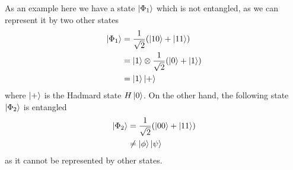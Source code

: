 As an example here we have a state $\ket{\Phi_1}$ which is not entangled, as we can represent it by two other states
\begin{equation}
\begin{split}
\ket{\Phi_1} &= \frac{1}{\sqrt{2}} ( \ket{10} + \ket{11}) \\ 
&= \ket{1}\otimes \frac{1}{\sqrt{2}} ( \ket{0} + \ket{1})\\ 
&= \ket{1} \ket{+}
\end{split}
\end{equation}
where $\ket +$ is the Hadmard  state $H \ket{0}$.
On the other hand, the following state $\ket{\Phi_2}$ is entangled 
\begin{equation}
\begin{split}
\ket{\Phi_2} &= \frac{1}{\sqrt{2}} ( \ket{00} + \ket{11}) \\
&\neq \ket{\phi}\ket{\psi}
\end{split}
\end{equation}
as it cannot be represented by other states.
